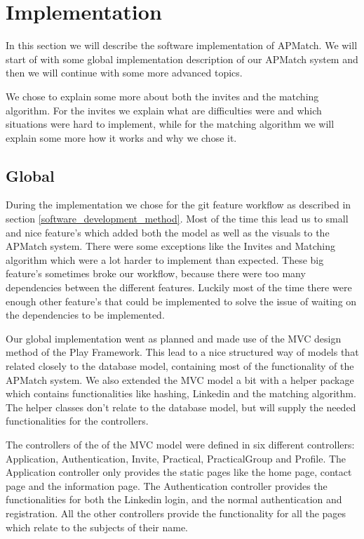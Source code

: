 \section{Implementation}
In this section we will describe the software implementation of APMatch.
We will start of with some global implementation description of our APMatch system and then we will continue with some more advanced topics.

We chose to explain some more about both the invites and the matching algorithm.
For the invites we explain what are difficulties were and which situations were hard to implement, while for the matching algorithm we will explain some more how it works and why we chose it.

\subsection{Global}
During the implementation we chose for the git feature workflow as described in section \ref{software_development_method}.
Most of the time this lead us to small and nice feature's which added both the model as well as the visuals to the APMatch system.
There were some exceptions like the Invites and Matching algorithm which were a lot harder to implement than expected.
These big feature's sometimes broke our workflow, because there were too many dependencies between the different features.
Luckily most of the time there were enough other feature's that could be implemented to solve the issue of waiting on the dependencies to be implemented.

Our global implementation went as planned and made use of the MVC design method of the Play Framework.
This lead to a nice structured way of models that related closely to the database model, containing most of the functionality of the APMatch system.
We also extended the MVC model a bit with a helper package which contains functionalities like hashing, Linkedin and the matching algorithm.
The helper classes don't relate to the database model, but will supply the needed functionalities for the controllers.

The controllers of the of the MVC model were defined in six different controllers: Application, Authentication, Invite, Practical, PracticalGroup and Profile.
The Application controller only provides the static pages like the home page, contact page and the information page.
The Authentication controller provides the functionalities for both the Linkedin login, and the normal authentication and registration.
All the other controllers provide the functionality for all the pages which relate to the subjects of their name.

